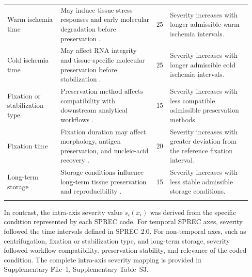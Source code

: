 \documentclass[preprint,12pt]{elsarticle}
\begin{document}
\begin{landscape}
\begin{longtable}{@{}L{3.7cm}L{9.2cm}L{1.3cm}L{7.4cm}@{}}
\addlinespace[0.4em]
\midrule
{} \\
\midrule

Warm ischemia time
& May induce tissue stress responses and early molecular degradation before preservation \cite{moore2011brisq,huang2001}.
& 25
& Severity increases with longer admissible warm ischemia intervals. \\

Cold ischemia time
& May affect RNA integrity and tissue-specific molecular preservation before stabilization \cite{huang2001,viana2013}.
& 25
& Severity increases with longer admissible cold ischemia intervals. \\

Fixation or stabilization type
& Preservation method affects compatibility with downstream analytical workflows \cite{moore2011brisq,lehmann2012}.
& 15
& Severity increases with less compatible admissible preservation methods. \\

Fixation time
& Fixation duration may affect morphology, antigen preservation, and nucleic-acid recovery \cite{moore2011brisq,lehmann2012}.
& 20
& Severity increases with greater deviation from the reference fixation interval. \\

Long-term storage
& Storage conditions influence long-term tissue preservation and reproducibility \cite{moore2011brisq,lehmann2012}.
& 15
& Severity increases with less stable admissible storage conditions. \\

\addlinespace[0.5em]
 \\

\end{longtable}

\normalsize
\end{landscape}


In contrast, the intra-axis severity value \(s_i(x_i)\) was derived from the specific condition represented by each SPREC code. For temporal SPREC axes, severity followed the time intervals defined in SPREC 2.0. For non-temporal axes, such as centrifugation, fixation or stabilization type, and long-term storage, severity followed workflow compatibility, preservation stability, and relevance of the coded condition. The complete intra-axis severity mapping is provided in Supplementary File~1, Supplementary Table~S3.
\end{document}
